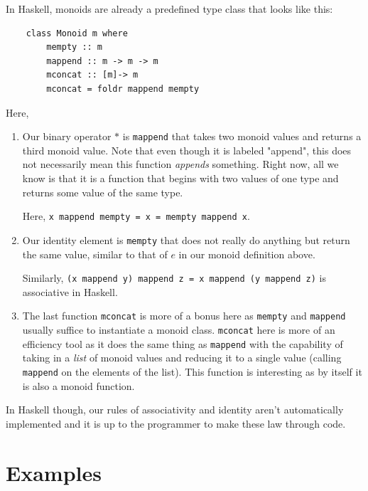 In Haskell, monoids are already a predefined type class that looks like this:
\begin{lstlisting}
    class Monoid m where
        mempty :: m
        mappend :: m -> m -> m
        mconcat :: [m]-> m
        mconcat = foldr mappend mempty
\end{lstlisting}
Here,
\begin{enumerate}
    \item Our binary operator $\ast$ is \lstinline{mappend} that takes two monoid values and returns a third monoid value. Note that even though it is labeled "append", this does not necessarily mean this function \textit{appends} something. Right now, all we know is that it is a function that begins with two values of one type and returns some value of the same type.
    
    Here, \lstinline{x mappend mempty = x = mempty mappend x}.
    
    \item Our identity element is \lstinline{mempty} that does not really do anything but return the same value, similar to that of $e$ in our monoid definition above. 
    
    Similarly, \lstinline{(x mappend y) mappend z = x mappend (y mappend z)} is associative in Haskell.
    
    \item The last function \lstinline{mconcat} is more of a bonus here as \lstinline{mempty} and \lstinline{mappend} usually suffice to instantiate a monoid class. \lstinline{mconcat} here is more of an efficiency tool as it does the same thing as \lstinline{mappend} with the capability of taking in a \textit{list} of monoid values and reducing it to a single value (calling \lstinline{mappend} on the elements of the list). This function is interesting as by itself it is also a monoid function.
\end{enumerate}
In Haskell though, our rules of associativity and identity aren't automatically implemented and it is up to the programmer to make these law through code.

\section{Examples}

